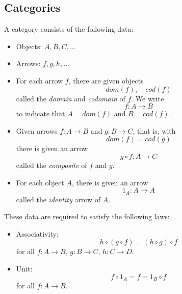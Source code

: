 \documentclass{article}
\begin{document}
\subsection{Categories}
\begin{defn}[{\cite{AS10}}]
A category consists of the following data:
\begin{itemize}
\item
Objects: $A,B,C,\dotsc$
\item
Arrows: $f,g,h,\dotsc$
\item
For each arrow $f$, there are given objects
\[
dom(f),\quad cod(f)
\]
called the \emph{domain} and \emph{codomain} of $f$. We write
\[
f: A \rightarrow B
\]
to indicate that $A = dom(f)$ and $B = cod(f)$.
\item
Given arrows $f: A \rightarrow B$ and $g: B \rightarrow C$, that is, with
\[
dom(f) = cod(g)
\]
there is given an arrow
\[
g \circ f: A \rightarrow C
\]
called the \emph{composite} of $f$ and $g$.
\item
For each object $A$, there is given an arrow
\[
1_{A}: A \rightarrow A
\]
called the \emph{identity} arrow of $A$.
\end{itemize}
These data are required to satisfy the following laws:
\begin{itemize}
\item
Associativity:
\[
h \circ ( g \circ f ) = ( h \circ g ) \circ f
\]
for all $f : A \rightarrow B$, $g : B \rightarrow C$, $h : C \rightarrow D$.
\item
Unit:
\[
f \circ 1_{A} = f = 1_{B} \circ f
\]
for all $f : A \rightarrow B$.
\end{itemize}
\end{defn}

\end{document}
